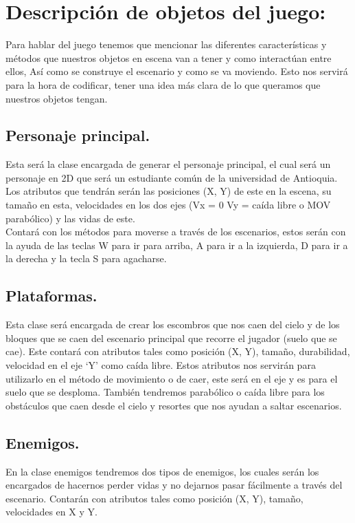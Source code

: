 \documentclass{article}
\begin{document}
\section{Descripción de objetos del juego:}\label{DescObjetos}

Para hablar del juego tenemos que mencionar las diferentes características y métodos que nuestros objetos en escena van a tener y como interactúan entre ellos, Así como se construye el escenario y como se va moviendo. Esto nos servirá para la hora de codificar, tener una idea más clara de lo que queramos que nuestros objetos tengan.

\subsection{Personaje principal.}

Esta será la clase encargada de generar el personaje principal, el cual será un personaje en 2D que será un estudiante común de la universidad de Antioquia. Los atributos que tendrán serán las posiciones (X, Y) de este en la escena, su tamaño en esta, velocidades en los dos ejes (Vx = 0 Vy = caída libre o MOV parabólico) y las vidas de este.\\
Contará con los métodos para moverse a través de los escenarios, estos serán con la ayuda de las teclas W para ir para arriba, A para ir a la izquierda, D para ir a la derecha y la tecla S para agacharse.

\subsection{Plataformas.}

Esta clase será encargada de crear los escombros que nos caen del cielo y de los bloques que se caen del escenario principal que recorre el jugador (suelo que se cae). Este contará con atributos tales como posición (X, Y), tamaño, durabilidad, velocidad en el eje ‘Y’ como caída libre. Estos atributos nos servirán para utilizarlo en el método de movimiento o de caer, este será en el eje y es para el suelo que se desploma. También tendremos parabólico o caída libre para los obstáculos que caen desde el cielo y resortes que nos ayudan a saltar escenarios. 

\subsection{Enemigos.}

En la clase enemigos tendremos dos tipos de enemigos, los cuales serán los encargados de hacernos perder vidas y no dejarnos pasar fácilmente a través del escenario. Contarán con atributos tales como posición (X, Y), tamaño, velocidades en X y Y.\\
\end{document}
